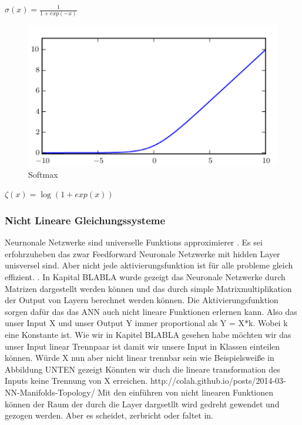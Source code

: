 \documentclass{llncs}
\begin{document}
\begin{math}
\sigma(x)=\frac{1}{1+exp(-x)}
\end{math}

\begin{figure}[htbp] 
	\centering
	\includegraphics[width=1.0\textwidth]{softmax.png}
	\caption{Softmax}
	\label{fig:Bild1}
\end{figure}

\begin{math}
\zeta(x) = \log(1+exp(x))
\end{math}

\newpage
\subsubsection{Nicht Lineare Gleichungssysteme}
Neurnonale Netzwerke sind universelle Funktions approximierer \cite{universal}. Es sei erfohrzuheben das zwar Feedforward Neuronale Netzwerke mit hidden Layer unisversel sind. Aber nicht jede aktivierungsfunktion ist für alle probleme gleich effizient. \cite{universal}.
In Kapital BLABLA wurde gezeigt das Neuronale Netzwerke durch Matrizen dargestellt werden können und das durch simple Matrixmultiplikation der Output von Layern berechnet werden können. Die Aktivierungsfunktion sorgen dafür das das ANN auch nicht lineare Funktionen erlernen kann. Also das unser Input X und unser Output Y immer proportional als Y = X$*$k. Wobei k eine Konstante ist.  Wie wir in Kapitel BLABLA gesehen habe möchten wir das unser Input linear Trennpaar ist damit wir unsere Input in Klassen einteilen können. Würde X nun aber nicht linear trennbar sein wie Beispielsweiße in Abbildung UNTEN gezeigt Könnten wir duch die lineare transformation des Inputs keine Trennung von X erreichen. http://colah.github.io/posts/2014-03-NN-Manifolds-Topology/ Mit den einführen von nicht linearen Funktionen können der Raum der durch die Layer dargsetllt wird gedreht gewendet und gezogen werden. Aber es scheidet, zerbricht oder faltet in. 
\end{document}
